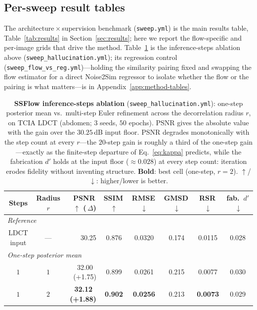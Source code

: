 \documentclass[letterpaper]{article} %
\begin{document}
\subsection{Per-sweep result tables}
\label{sec:sweep-tables}
The architecture\,$\times$\,supervision benchmark (\texttt{sweep.yml}) is the
main results table, Table~\ref{tab:results} in Section~\ref{sec:results}; here we
report the flow-specific and per-image grids that drive the method.
Table~\ref{tab:ssflow-steps} is the inference-steps ablation above
(\texttt{sweep\_hallucination.yml}); its regression control
(\texttt{sweep\_flow\_vs\_reg.yml})---holding the similarity pairing fixed and
swapping the flow estimator for a direct Noise2Sim regressor to isolate whether
the flow or the pairing is what matters---is in Appendix~\ref{app:method-tables}.

\begin{table}[t]
  \centering
  \small
  \caption{\textbf{SSFlow inference-steps ablation} (\texttt{sweep\_hallucination.yml}):
           one-step posterior mean vs.\ multi-step Euler refinement across the
           decorrelation radius $r$, on TCIA LDCT (abdomen; $3$ seeds, $50$
           epochs).  PSNR gives the absolute value with the gain over the
           $30.25$\,dB input floor.  PSNR degrades monotonically with the
           step count at every $r$---the $20$-step gain is roughly a third of the
           one-step gain---exactly as the finite-step departure of
           Eq.~\eqref{eq:kappa} predicts, while the fabrication $d'$ holds at the
           input floor ($\approx$$0.028$) at every step count: iteration
           erodes fidelity without inventing structure.  \textbf{Bold}: best cell
           (one-step, $r{=}2$).  $\uparrow$/$\downarrow$: higher/lower is better.}
  \label{tab:ssflow-steps}
  \begin{tabular}{ccrccccc}
    \toprule
    \textbf{Steps} & \textbf{Radius $r$} &
    PSNR\,$\uparrow$ (\,$\Delta$) & SSIM\,$\uparrow$ & RMSE\,$\downarrow$ &
    GMSD\,$\downarrow$ & RSR\,$\downarrow$ & fab.\ $d'$\,$\downarrow$ \\
    \midrule
    \multicolumn{8}{l}{\emph{Reference}} \\
    \quad LDCT input & --- & 30.25 & 0.876 & 0.0320 & 0.174 & 0.0115 & 0.028 \\
    \midrule
    \multicolumn{8}{l}{\emph{One-step posterior mean}} \\
    $1$ & $1$ & 32.00 \,(+1.75) & 0.899 & 0.0261 & 0.215 & 0.0077 & 0.030 \\
    $1$ & $2$ & \textbf{32.12 \,(+1.88)} & \textbf{0.902} & \textbf{0.0256} & 0.213 & \textbf{0.0073} & 0.029 \\

\end{tabular}
\end{table}
\end{document}
